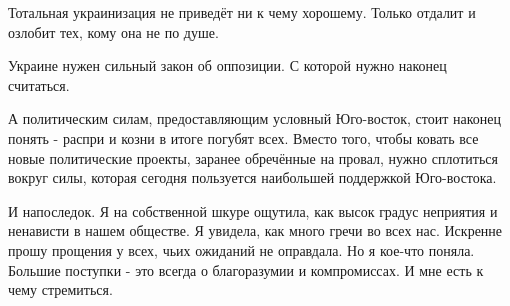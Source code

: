 Тотальная украинизация не приведёт ни к чему хорошему. Только отдалит и озлобит
тех, кому она не по душе. 

Украине нужен сильный закон об оппозиции. С которой нужно наконец считаться. 

А политическим силам, предоставляющим условный Юго-восток, стоит наконец понять
- распри и козни в итоге погубят всех. Вместо того, чтобы ковать все новые
политические проекты, заранее обречённые  на провал, нужно сплотиться вокруг
силы, которая сегодня пользуется наибольшей поддержкой Юго-востока. 

И напоследок. Я на собственной шкуре ощутила, как высок градус неприятия и
ненависти в нашем обществе. Я увидела, как много гречи во всех нас. Искренне
прошу прощения у всех, чьих ожиданий не оправдала. Но я кое-что поняла. Большие
поступки - это всегда о благоразумии и компромиссах. И мне есть к чему
стремиться.


